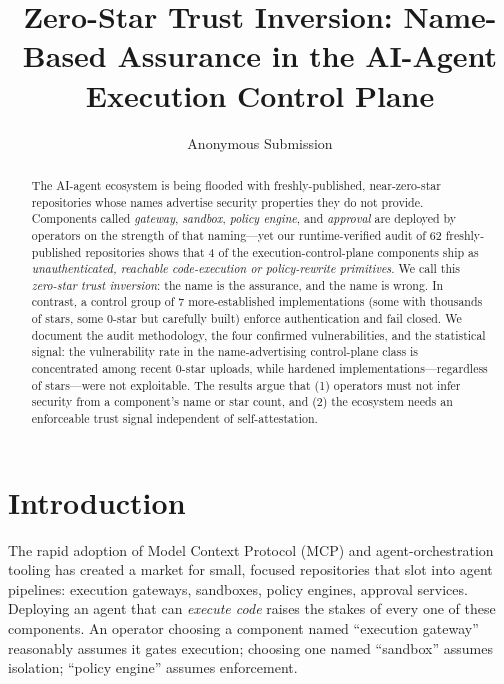 \documentclass{llncs}
\title{Zero-Star Trust Inversion: Name-Based Assurance in the AI-Agent Execution Control Plane}
\author{Anonymous Submission}
\institute{Anonymous Institution}
\begin{document}
\maketitle

\begin{abstract}
The AI-agent ecosystem is being flooded with freshly-published, near-zero-star repositories whose names advertise security properties they do not provide. Components called \emph{gateway}, \emph{sandbox}, \emph{policy engine}, and \emph{approval} are deployed by operators on the strength of that naming---yet our runtime-verified audit of 62 freshly-published repositories shows that 4 of the execution-control-plane components ship as \emph{unauthenticated, reachable code-execution or policy-rewrite primitives}. We call this \emph{zero-star trust inversion}: the name is the assurance, and the name is wrong. In contrast, a control group of 7 more-established implementations (some with thousands of stars, some 0-star but carefully built) enforce authentication and fail closed. We document the audit methodology, the four confirmed vulnerabilities, and the statistical signal: the vulnerability rate in the name-advertising control-plane class is concentrated among recent 0-star uploads, while hardened implementations---regardless of stars---were not exploitable. The results argue that (1) operators must not infer security from a component's name or star count, and (2) the ecosystem needs an enforceable trust signal independent of self-attestation.
\end{abstract}

\section{Introduction}\label{sec:intro}
The rapid adoption of Model Context Protocol (MCP) and agent-orchestration tooling has created a market for small, focused repositories that slot into agent pipelines: execution gateways, sandboxes, policy engines, approval services. Deploying an agent that can \emph{execute code} raises the stakes of every one of these components. An operator choosing a component named ``execution gateway'' reasonably assumes it gates execution; choosing one named ``sandbox'' assumes isolation; ``policy engine'' assumes enforcement.
\end{document}
